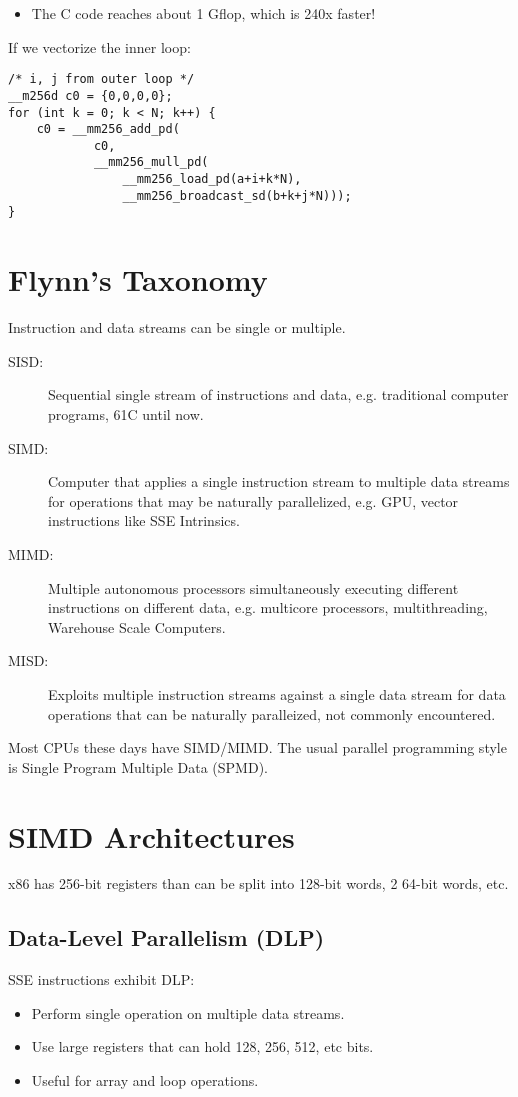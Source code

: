 \begin{itemize}
    \item The C code reaches about 1 Gflop, which is 240x faster!
\end{itemize}

If we vectorize the inner loop:

\begin{verbatim}
/* i, j from outer loop */
__m256d c0 = {0,0,0,0};
for (int k = 0; k < N; k++) {
	c0 = __mm256_add_pd( 
		    c0,
            __mm256_mull_pd(
                __mm256_load_pd(a+i+k*N),
                __mm256_broadcast_sd(b+k+j*N)));
}
\end{verbatim}


\section{Flynn's Taxonomy}
Instruction and data streams can be single or multiple.
\begin{description}
	\item[SISD:] Sequential single stream of instructions and data, e.g. traditional computer programs, 61C until now.
	\item[SIMD:] Computer that applies a single instruction stream to multiple data streams for operations that may be naturally parallelized, e.g. GPU, vector instructions like SSE Intrinsics.
	\item[MIMD:] Multiple autonomous processors simultaneously executing different instructions on different data, e.g. multicore processors, multithreading, Warehouse Scale Computers.
	\item[MISD:] Exploits multiple instruction streams against a single data stream for data operations that can be naturally paralleized, not commonly encountered.
\end{description}
Most CPUs these days have SIMD/MIMD. The usual parallel programming style is Single Program Multiple Data (SPMD).


\section{SIMD Architectures}
x86 has 256-bit registers than can be split into 128-bit words, 2 64-bit words, etc.

\subsection{Data-Level Parallelism (DLP)}
SSE instructions exhibit DLP:
\begin{itemize}
    \item Perform single operation on multiple data streams.
    \item Use large registers that can hold 128, 256, 512, etc bits.
    \item Useful for array and loop operations.
\end{itemize}

